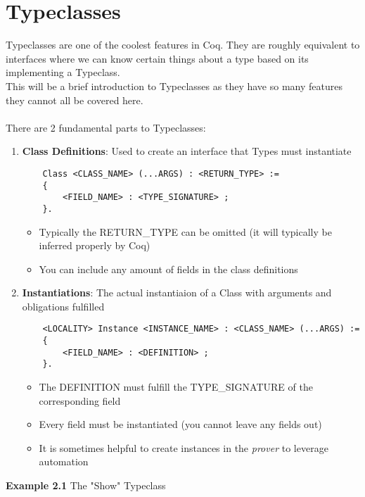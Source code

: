 \documentclass{article}
\begin{document}
    \section{Typeclasses}
    Typeclasses are one of the coolest features in Coq. They are roughly equivalent to interfaces where we can know certain things about a type based on its implementing a Typeclass. \\
    This will be a brief introduction to Typeclasses as they have so many features they cannot all be covered here.
    \\~\\
    There are 2 fundamental parts to Typeclasses:
    \begin{enumerate}
        \item \textbf{Class Definitions}: Used to create an interface that Types must instantiate
        \begin{verbatim}
    Class <CLASS_NAME> (...ARGS) : <RETURN_TYPE> := 
    {
        <FIELD_NAME> : <TYPE_SIGNATURE> ; 
    }.
        \end{verbatim} 
        
        \begin{itemize}
            \item Typically the RETURN\_TYPE can be omitted (it will typically be inferred properly by Coq)
            \item You can include any amount of fields in the class definitions
        \end{itemize} 

        \item \textbf{Instantiations}: The actual instantiaion of a Class with arguments and obligations fulfilled
        \begin{verbatim}
    <LOCALITY> Instance <INSTANCE_NAME> : <CLASS_NAME> (...ARGS) :=
    {
        <FIELD_NAME> : <DEFINITION> ;
    }.
        \end{verbatim}
        \begin{itemize}
            \item The DEFINITION must fulfill the TYPE\_SIGNATURE of the corresponding field
            \item Every field must be instantiated (you cannot leave any fields out)
            \item It is sometimes helpful to create instances in the \emph{prover} to leverage automation
        \end{itemize}
    \end{enumerate}
    \textbf{Example 2.1} The "Show" Typeclass \\
\end{document}
